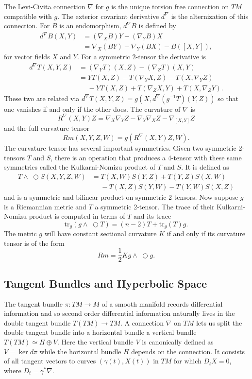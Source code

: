 \documentclass{amsart}
\newcommand{\tr}{\mathrm{tr}}
\newcommand{\wtimes}{\wedge \!\!\!\!\!\!\!\!\;\bigcirc}
\begin{document}
The Levi-Civita connection $\nabla$ for $g$ is the unique torsion free connection on $TM$ compatible with $g$.
The exterior covariant derivative $d^\nabla$ is the alternization of this connection.
For $B$ is an endomorphism, $d^\nabla B$ is defined by
\begin{align*}
d^\nabla B(X,Y) &= (\nabla_XB)Y - (\nabla_YB)X \\
&= \nabla_X(BY)- \nabla_Y(BX) - B([X,Y]),
\end{align*}
for vector fields $X$ and $Y$.
For a symmetric 2-tensor the derivative is 
\begin{align*}
d^\nabla T(X,Y,Z)
&= (\nabla_YT)(X,Z)- (\nabla_Z T)(X,Y) \\
&= YT(X,Z) - T(\nabla_YX,Z) - T(X,\nabla_YZ) \\
&\phantom{=} - YT(X,Z) + T(\nabla_ZX,Y) + T(X,\nabla_ZY).
\end{align*}
These two are related via $d^\nabla T(X,Y,Z) = g(X, d^\nabla(g^{-1}T)(Y,Z))$ so that one vanishes if and only if the other does.
The curvature of $\nabla$ is 
\[
R^\nabla(X,Y)Z = \nabla_X\nabla_Y Z - \nabla_Y\nabla_X Z - \nabla_{[X,Y]}Z
\]
and the full curvature tensor 
\[
Rm(X,Y,Z,W) = g(R^\nabla(X,Y)Z,W).
\]
The curvature tensor has several important symmetries.
Given two symmetric 2-tensors $T$ and $S$, there is an operation that produces a 4-tensor with these same symmetries called the Kulkarni-Nomizu product of $T$ and $S$. 
It is defined as
\begin{align*}
T \wtimes S(X,Y,Z,W)
&= T(X,W)S(Y,Z) + T(Y,Z)S(X,W) \\
&\phantom{=} - T(X,Z)S(Y,W) - T(Y,W)S(X,Z)
\end{align*}
and is a symmetric and bilinear product on symmetric 2-tensors.
Now suppose $g$ is a Riemannian metric and $T$ a symmetric 2-tensor.
The trace of their Kulkarni-Nomizu product is computed in terms of $T$ and its trace
\[
\tr_g( g \wtimes T) = (n-2)T + \tr_g(T)g.
\]
The metric $g$ will have constant sectional curvature $K$ if and only if its curvature tensor is of the form 
\[
Rm = \frac{1}{2}K g \wtimes g.
\]

\subsection{Tangent Bundles and Hyperbolic Space}

The tangent bundle $\pi:TM \to M$ of a smooth manifold records differential information and so second order differential information naturally lives in the double tangent bundle $T(TM) \to TM$.
A connection $\nabla$ on $TM$ lets us split the double tangent bundle into a horizontal bundle a vertical bundle $T(TM) \simeq H \oplus V$.
Here the vertical bundle $V$ is canonically defined as $V = \ker d\pi$ while the horizontal bundle $H$ depends on the connection.
It consists of all tangent vectors to curves $(\gamma(t),X(t))$ in $TM$ for which $D_tX = 0$, where $D_t = \gamma^*\nabla$.
\end{document}
